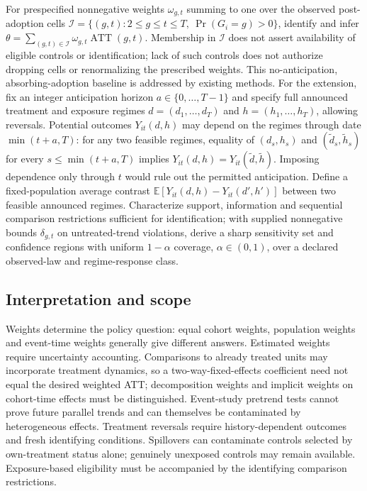 \documentclass[11pt,a4paper]{article}
\begin{document}
For prespecified nonnegative weights $\omega_{g,t}$ summing to one over the observed post-adoption cells $\mathcal I=\{(g,t):2\le g\le t\le T,\ \Pr(G_i=g)>0\}$, identify and infer $\theta=\sum_{(g,t)\in\mathcal I}\omega_{g,t}\operatorname{ATT}(g,t)$. Membership in $\mathcal I$ does not assert availability of eligible controls or identification; lack of such controls does not authorize dropping cells or renormalizing the prescribed weights. This no-anticipation, absorbing-adoption baseline is addressed by existing methods. For the extension, fix an integer anticipation horizon $a\in\{0,\ldots,T-1\}$ and specify full announced treatment and exposure regimes $d=(d_1,\ldots,d_T)$ and $h=(h_1,\ldots,h_T)$, allowing reversals. Potential outcomes $Y_{it}(d,h)$ may depend on the regimes through date $\min(t+a,T)$: for any two feasible regimes, equality of $(d_s,h_s)$ and $(\tilde d_s,\tilde h_s)$ for every $s\le\min(t+a,T)$ implies $Y_{it}(d,h)=Y_{it}(\tilde d,\tilde h)$. Imposing dependence only through $t$ would rule out the permitted anticipation. Define a fixed-population average contrast $\mathbb E[Y_{it}(d,h)-Y_{it}(d',h')]$ between two feasible announced regimes. Characterize support, information and sequential comparison restrictions sufficient for identification; with supplied nonnegative bounds $\delta_{g,t}$ on untreated-trend violations, derive a sharp sensitivity set and confidence regions with uniform $1-\alpha$ coverage, $\alpha\in(0,1)$, over a declared observed-law and regime-response class.

\subsection*{Interpretation and scope}

Weights determine the policy question: equal cohort weights, population weights and event-time weights generally give different answers. Estimated weights require uncertainty accounting. Comparisons to already treated units may incorporate treatment dynamics, so a two-way-fixed-effects coefficient need not equal the desired weighted ATT; decomposition weights and implicit weights on cohort-time effects must be distinguished. Event-study pretrend tests cannot prove future parallel trends and can themselves be contaminated by heterogeneous effects. Treatment reversals require history-dependent outcomes and fresh identifying conditions. Spillovers can contaminate controls selected by own-treatment status alone; genuinely unexposed controls may remain available. Exposure-based eligibility must be accompanied by the identifying comparison restrictions.
\end{document}
